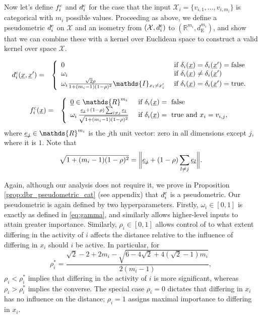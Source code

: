 \documentclass[letterpaper]{article}
\newcommand{\vect}[1]{\underline{\smash{#1}}}
\renewcommand{\v}[1]{\vect{#1}}
\newcommand{\reals}{\mathds{R}}
\newcommand{\sX}{\mathcal{X}}
\newcommand{\cat}{^{\text{\textnormal{c}}}}
\newcommand{\indicator}{\ensuremath\mathds{I}}
\begin{document}
Now let's define $f\cat_i$ and $d\cat_i$ for the case that the input $\sX_i=\{v_{i,1}, \dots, v_{i,m_i}\}$ is categorical with $m_i$ possible values. 
Proceeding as above, we define a pseudometric $d\cat_i$ on $\sX$ and an isometry from $(\sX, d\cat_i)$ to $(\reals^{m_i},d_{\text{E}}^{m_i})$, and show that we can combine these
with a kernel over Euclidean space to construct a valid kernel over space $\sX$. 

\begin{eqnarray}
\nonumber{}d\cat_i(\v{x}, \v{x}') & = & \left\{
\begin{array}{ll}
\nonumber{} 0 & \textrm{ if } \delta_i(\v{x}) = \delta_i(\v{x}') = \textrm{false}\\
\nonumber{} \omega_i & \textrm{ if } \delta_i(\v{x}) \neq \delta_i(\v{x}')\\
\nonumber{} \omega_i \frac{\sqrt{2} \rho}
{1+(m_i-1)(1-\rho)^2}
 \indicator_{x_i \neq x_i'} 
& \textrm{ if } \delta_i(\v{x}) = \delta_i(\v{x}') = \textrm{true}.
\end{array}
\right.
\end{eqnarray}

\begin{eqnarray}
\nonumber{}f\cat_i(\v{x}) & = & \left\{\begin{array}{ll}
\v{0} \in \reals^{m_i} & \textrm{ if } \delta_i(\v{x}) = \textrm{ false }\\
\nonumber{} \omega_i\,\frac{\v{e_j}+(1-\rho)\sum_{l\neq j} \v{e_l}}
{\sqrt{1+(m_i-1)(1-\rho)^2}}
 & \textrm{ if } \delta_i(\v{x}) = \textrm{ true and } x_i = v_{i,j},
\end{array}\right.
\end{eqnarray}
\noindent{}where $\v{e_j} \in \reals^{m_i}$ is the $j$th unit vector: zero in all dimensions except $j$, where it is $1$. Note that
\begin{equation}
 \sqrt{1+(m_i-1)(1-\rho)^2} = \biggl\|\v{e_j}+(1-\rho)\sum_{l\neq j} \v{e_l}\biggr\|.
\end{equation}

\noindent{}Again, although our analysis does not require it, we prove in Proposition \ref{prop:dbr_pseudometric_cat} (see appendix) that $d\cat_i$ is a pseudometric. Our pseudometric is again defined by two hyperparameters. Firstly, $\omega_i\in[0,1]$ is exactly as defined in \eqref{eq:gamma}, and similarly allows higher-level inputs to attain greater importance. Similarly, $\rho_i\in[0,1]$ allows control of to what extent differing in the activity of $i$ affects the distance relative to the influence of differing in $x_i$ should $i$ be active. In particular, for
\begin{equation}
 \rho_i^\ast = 
\frac{\sqrt{2}-2+2m_i-\sqrt{6-4\sqrt{2}+4(\sqrt{2}-1)m_i}}
{2(m_i-1)},
\end{equation}
$\rho_i<\rho_i^\ast$ implies that differing in the activity of $i$ is more significant, whereas $\rho_i>\rho_i^\ast$ implies the converse. The special case $\rho_i = 0$ dictates that differing in $x_i$ has no influence on the distance; $\rho_i=1$ assigns maximal importance to differing in $x_i$. 
\end{document}
